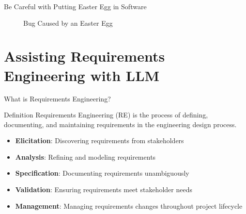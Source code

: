 \documentclass{beamer}
\begin{document}
\begin{frame}[t]{Be Careful with Putting Easter Egg in Software}
        \begin{figure}[b]
        \centering
        \qquad    


        \caption{Bug Caused by an Easter Egg}
        \end{figure}
    
    

    
\end{frame}

\section{Assisting Requirements Engineering with LLM}

\begin{frame}[t]{What is Requirements Engineering?}
    \begin{block}{Definition}
        Requirements Engineering (RE) is the process of defining, documenting, and maintaining requirements in the engineering design process.
    \end{block}
    
    \begin{itemize}
        \item \textbf{Elicitation}: Discovering requirements from stakeholders
        \item \textbf{Analysis}: Refining and modeling requirements
        \item \textbf{Specification}: Documenting requirements unambiguously
        \item \textbf{Validation}: Ensuring requirements meet stakeholder needs
        \item \textbf{Management}: Managing requirements changes throughout project lifecycle
    \end{itemize}
\end{frame}
\end{document}
